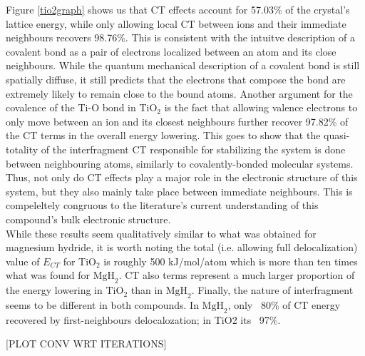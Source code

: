 \documentclass[aps,prb,twocolumn,amsmath,amssymb,superscriptaddress,longbibliography]{revtex4-1}
\newcommand{\N}{\mathbb{N}}
\newcommand{\C}{\mathbb{C}}
\begin{document}
Figure \ref{tio2graph} shows us that CT effects account for 57.03\% of the crystal's lattice energy, while only allowing local CT between ions and their immediate neighbours recovers 98.76\%.
This is consistent with the intuitve description of a covalent bond as a pair of electrons localized between an atom and its close neighbours. While the quantum mechanical description of a covalent bond is still spatially diffuse, it still predicts that the electrons that compose the bond are extremely likely to remain close to the bound atoms.
Another argument for the covalence of the Ti-O bond in $\text{TiO}_{2}$ is the fact that allowing valence electrons to only move between an ion and its closest neighbours further recover 97.82\% of the CT terms in the overall energy lowering. 
This goes to show that the quasi-totality of the interfragment CT responsible for stabilizing the system is done between neighbouring atoms, similarly to covalently-bonded molecular systems. 
Thus, not only do CT effects play a major role in the electronic structure of this system, but they also mainly take place between immediate neighbours. 
This is compeleltely congruous to the literature's current understanding of this compound's bulk electronic structure.\\

While these results seem qualitatively similar to what was obtained for magnesium hydride, it is worth noting the total (i.e. allowing full delocalization) value of $E_{CT}$ for $\text{TiO}_{2}$ is roughly 500 kJ/mol/atom which is more than ten times what was found for $\text{MgH}_{2}$.
CT also terms represent a much larger proportion of the energy lowering in $\text{TiO}_{2}$ than in $\text{MgH}_{2}$.
Finally, the nature of interfragment seems to be different in both compounds. In $\text{MgH}_{2}$, only ~80\% of CT energy recovered by first-neighbours delocalozation; in TiO2 its ~97\%.


  





[PLOT CONV WRT ITERATIONS]

\end{document}
